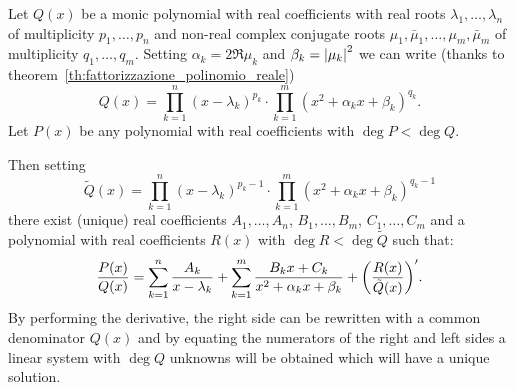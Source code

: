 \begin{theorem}
\label{th:Hermite}%
%
%
Let $Q(x)$ be a monic polynomial with real coefficients
with real roots $\lambda_1, \dots, \lambda_n$ of multiplicity
$p_1, \dots, p_n$ and non-real complex conjugate roots
$\mu_1, \bar \mu_1, \dots, \mu_m, \bar \mu_m$ of multiplicity
$q_1, \dots, q_m$. Setting $\alpha_k = 2\Re \mu_k$ and $\beta_k = {\left|\mu_k\right|}^2$
we can write (thanks to theorem~\ref{th:fattorizzazione_polinomio_reale})
\begin{equation}\label{eq:8845638}
    Q(x) = \prod_{k=1}^n (x-\lambda_k)^{p_k} \cdot \prod_{k=1}^m (x^2+ \alpha_k
  x + \beta_k)^{q_k}.
\end{equation}
Let $P(x)$ be any polynomial with real coefficients
with $\deg P < \deg Q$.

Then setting
\[
 \tilde Q(x) = \prod_{k=1}^n (x-\lambda_k)^{p_k-1} \cdot \prod_{k=1}^m (x^2+\alpha_k x+\beta_k)^{q_k-1}
\]
there exist (unique) real coefficients
$A_1,\dots, A_n$, $B_1, \dots, B_m$, $C_1,\dots, C_m$
and a polynomial with real coefficients $R(x)$ with $\deg R < \deg \tilde Q$
such that:
\begin{equation}\label{eq:scomposizione_hermite}
  \frac{P(x)}{Q(x)} = \sum_{k=1}^n \frac{A_k}{x-\lambda_k}
  + \sum_{k=1}^m \frac{B_k x + C_k}{x^2+\alpha_k x + \beta_k}
  + {\left( \frac{R(x)}{\tilde Q(x)} \right)}'.
\end{equation}
By performing the derivative, the right side can be
rewritten with a common denominator $Q(x)$
and by equating the numerators of the right and left sides
a linear system with $\deg Q$ unknowns will be obtained
which will have a unique solution.
\end{theorem}
%
